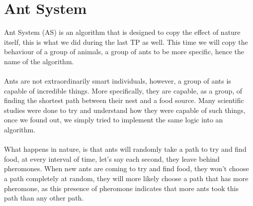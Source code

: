 \documentclass[a4paper]{article}
\begin{document}
\section{Ant System}
Ant System (AS) is an algorithm that is designed to copy the effect of nature itself, this is what we did during the last TP as well. This time we will copy the behaviour of a group of animals, a group of ants to be more specific, hence the name of the algorithm.\\\\ Ants are not extraordinarily smart individuals, however, a group of ants is capable of incredible things. More specifically, they are capable, as a group, of finding the shortest path between their nest and a food source. Many scientific studies were done to try and understand how they were capable of such things, once we found out, we simply tried to implement the same logic into an algorithm.\\\\
What happens in nature, is that ants will randomly take a path to try and find food, at every interval of time, let's say each second, they leave behind pheromones. When new ants are coming to try and find food, they won't choose a path completely at random, they will more likely choose a path that has more pheromone, as this presence of pheromone indicates that more ants took this path than any other path.
\end{document}
